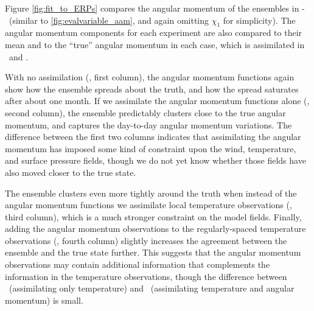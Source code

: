 Figure \ref{fig:fit_to_ERPs} compares the angular momentum of the ensembles in \NODA-\ERPRST~(similar to \ref{fig:evalvariable_aam}, and again omitting $\chi_1$ for simplicity). 
The angular momentum components for each experiment are also compared to their mean and to the ``true'' angular momentum in each case, which is assimilated in \ERPALL ~and \ERPRST.  

With no assimilation (\NODA, first column), the angular momentum functions again show how the ensemble spreads about the truth, and how the spread saturates after about one month.
If we assimilate the angular momentum functions alone (\ERPALL, second column), the ensemble predictably clusters close to the true angular momentum, and captures the day-to-day angular momentum variations. 
The difference between the first two columns indicates that assimilating the angular momentum has imposed some kind of constraint upon the wind, temperature, and surface pressure fields, though we do not yet know whether those fields have also moved closer to the true state. 

The ensemble clusters even more tightly around the truth when instead of the angular momentum functions we assimilate local temperature observations (\RST, third column), which is a much stronger constraint on the model fields. 
Finally, adding the angular momentum observations to the regularly-spaced temperature observations (\ERPRST, fourth column) slightly increases the agreement between the ensemble and the true state further.  
This suggests that the angular momentum observations may contain additional information that complements the information in the temperature observations, though the difference between \RST ~(assimilating only temperature) and \ERPRST ~(assimilating temperature and angular momentum) is small.  
